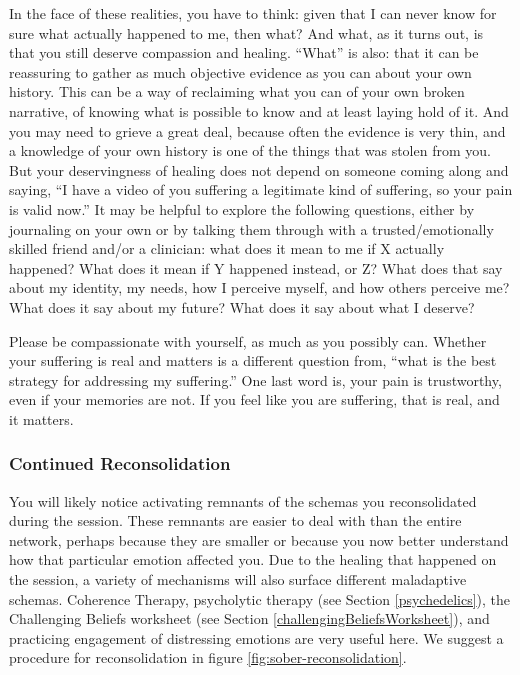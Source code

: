 \documentclass[12pt,letterpaper]{article}
\begin{document}
In the face of these realities, you have to think: given that I can never know for sure what actually happened to me, then what?  And what, as it turns out, is that you still deserve compassion and healing.  “What” is also: that it can be reassuring to gather as much objective evidence as you can about your own history. This can be a way of reclaiming what you can of your own broken narrative, of knowing what is possible to know and at least laying hold of it. And you may need to grieve a great deal, because often the evidence is very thin, and a knowledge of your own history is one of the things that was stolen from you. But your deservingness of healing does not depend on someone coming along and saying, “I have a video of you suffering a legitimate kind of suffering, so your pain is valid now.” It may be helpful to explore the following questions, either by journaling on your own or by talking them through with a trusted/emotionally skilled friend and/or a clinician: what does it mean to me if X actually happened? What does it mean if Y happened instead, or Z? What does that say about my identity, my needs, how I perceive myself, and how others perceive me? What does it say about my future? What does it say about what I deserve?

Please be compassionate with yourself, as much as you possibly can. Whether your suffering is real and matters is a different question from, “what is the best strategy for addressing my suffering.” One last word is, your pain is trustworthy, even if your memories are not. If you feel like you are suffering, that is real, and it matters.
\subsubsection{Continued Reconsolidation}
\label{sec:reconsolidation}
You will likely notice activating remnants of the schemas you reconsolidated during the session. These remnants are easier to deal with than the entire network, perhaps because they are smaller or because you now better understand how that particular emotion affected you. Due to the healing that happened on the session, a variety of mechanisms will also surface different maladaptive schemas. Coherence Therapy, psycholytic therapy (see Section \ref{psychedelics}), the Challenging Beliefs worksheet (see Section \ref{challengingBeliefsWorksheet}), and practicing engagement of distressing emotions are very useful here. We suggest a procedure for reconsolidation in figure \ref{fig:sober-reconsolidation}.
\end{document}
